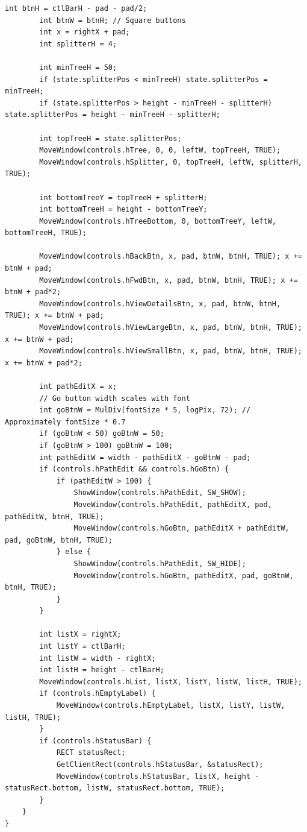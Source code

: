 \begin{lstlisting}[style=CodeListing]
        int btnH = ctlBarH - pad - pad/2;
        int btnW = btnH; // Square buttons
        int x = rightX + pad;
        int splitterH = 4;
        
        int minTreeH = 50;
        if (state.splitterPos < minTreeH) state.splitterPos = minTreeH;
        if (state.splitterPos > height - minTreeH - splitterH) state.splitterPos = height - minTreeH - splitterH;
        
        int topTreeH = state.splitterPos;
        MoveWindow(controls.hTree, 0, 0, leftW, topTreeH, TRUE);
        MoveWindow(controls.hSplitter, 0, topTreeH, leftW, splitterH, TRUE);
        
        int bottomTreeY = topTreeH + splitterH;
        int bottomTreeH = height - bottomTreeY;
        MoveWindow(controls.hTreeBottom, 0, bottomTreeY, leftW, bottomTreeH, TRUE);
        
        MoveWindow(controls.hBackBtn, x, pad, btnW, btnH, TRUE); x += btnW + pad;
        MoveWindow(controls.hFwdBtn, x, pad, btnW, btnH, TRUE); x += btnW + pad*2;
        MoveWindow(controls.hViewDetailsBtn, x, pad, btnW, btnH, TRUE); x += btnW + pad;
        MoveWindow(controls.hViewLargeBtn, x, pad, btnW, btnH, TRUE); x += btnW + pad;
        MoveWindow(controls.hViewSmallBtn, x, pad, btnW, btnH, TRUE); x += btnW + pad*2;
        
        int pathEditX = x;
        // Go button width scales with font
        int goBtnW = MulDiv(fontSize * 5, logPix, 72); // Approximately fontSize * 0.7
        if (goBtnW < 50) goBtnW = 50;
        if (goBtnW > 100) goBtnW = 100;
        int pathEditW = width - pathEditX - goBtnW - pad;
        if (controls.hPathEdit && controls.hGoBtn) {
            if (pathEditW > 100) {
                ShowWindow(controls.hPathEdit, SW_SHOW);
                MoveWindow(controls.hPathEdit, pathEditX, pad, pathEditW, btnH, TRUE);
                MoveWindow(controls.hGoBtn, pathEditX + pathEditW, pad, goBtnW, btnH, TRUE);
            } else {
                ShowWindow(controls.hPathEdit, SW_HIDE);
                MoveWindow(controls.hGoBtn, pathEditX, pad, goBtnW, btnH, TRUE);
            }
        }
        
        int listX = rightX;
        int listY = ctlBarH;
        int listW = width - rightX;
        int listH = height - ctlBarH;
        MoveWindow(controls.hList, listX, listY, listW, listH, TRUE);
        if (controls.hEmptyLabel) {
            MoveWindow(controls.hEmptyLabel, listX, listY, listW, listH, TRUE);
        }
        if (controls.hStatusBar) {
            RECT statusRect;
            GetClientRect(controls.hStatusBar, &statusRect);
            MoveWindow(controls.hStatusBar, listX, height - statusRect.bottom, listW, statusRect.bottom, TRUE);
        }
    }
}


\end{lstlisting}
